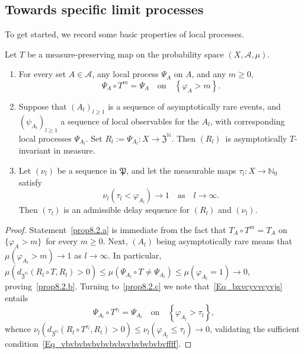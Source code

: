 \documentclass[10pt]{amsart}
\theoremstyle{definition}\newtheorem{defi}[theo]{Definition}\newtheorem{rema}[theo]{Remark}\newtheorem{exam}[theo]{Example}\newtheorem{exem}[theo]{Example}\newtheorem{nota}[theo]{Notation}
\newcommand{\clA}{\mathcal{A}}
\newcommand{\frkP}{\mathfrak{P}}
\newcommand{\frkZ}{\mathfrak{Z}}
\newcommand{\bbN}{\mathbb{N}}
\newcommand*{\alphenumi}{\renewcommand*{\theenumi}{\alph{enumi}}}
\begin{document}
\subsection{Towards specific limit processes}
To get started, we record some basic properties of local processes.

\begin{prop}\label{P_AsyInvarAdmissDelayInternal}
Let $T$ be a measure-preserving map on the probability space $(X,\clA,\mu)$.
\begin{enumerate}\alphenumi
\item\label{prop8.2.a} For every set $A\in\clA$, any local process $\Psi_{A}$ on $A$, and any $m\geq0$,
\begin{equation}\label{Eq_bxvcyvvcyvjs}
\Psi_{A}\circ T^{m}=\Psi_{A} \quad\text{on}\quad\left\{\varphi_{A}>m\right\}.
\end{equation}
\item\label{prop8.2.b} Suppose that $(A_{l})_{l\geq1}$ is a sequence of asymptotically rare events, and $(\psi_{A_{l}})_{l\geq1}$ a sequence of local observables for the $A_{l}$, with corresponding local processes $\Psi_{A_{l}}$. Set $R_{l}:=\Psi_{A_{l}}:X\rightarrow\frkZ^{\bbN}$. Then $(R_{l})$\emph{\ }is asymptotically $T$-invariant in measure.
\item\label{prop8.2.c} Let $(\nu_{l})$ be a sequence in $\frkP$, and let the measurable maps $\tau_{l}:X\rightarrow\bbN_{0}$ satisfy
\begin{equation}
\nu_{l}\left(\tau_{l}<\varphi_{A_{l}}\right) \longrightarrow1\quad\text{as}\quad l\rightarrow\infty.
\end{equation}
Then $(\tau_{l})$ is an admissible delay sequence for $(R_{l})$ and $(\nu _{l})$.
\end{enumerate}
\end{prop}

\begin{proof}
Statement~\eqref{prop8.2.a} is immediate from the fact that $T_{A}\circ T^{m}=T_{A}$ on $\{\varphi_{A}>m\}$\ for every $m\geq0$. Next, $(A_{l})$ being asymptotically rare means that $\mu(\varphi_{A_{l}}>m)\rightarrow1$ as $l\rightarrow\infty$. In particular, $\mu(d_{\frkZ^{\bbN}}(R_{l}\circ T,R_{l})>0)\leq\mu(\Psi_{A_{l}}\circ T\neq\Psi_{A_{l}})\leq\mu(\varphi_{A_{l} }=1)\rightarrow0$, proving~\eqref{prop8.2.b}. Turning to~\eqref{prop8.2.c} we note that~\eqref{Eq_bxvcyvvcyvjs} entails
\[
\Psi_{A_{l}}\circ T^{\tau_{l}}=\Psi_{A_{l}} \quad\text{on} \quad\left\{\varphi_{A_{l}}>\tau_{l}\right\},
\]
whence $\nu_{l}(d_{\frkZ^{\bbN}}(R_{l}\circ T^{\tau_{l}},R_{l})>0)\leq\nu_{l}(\varphi_{A_{l}}\leq\tau_{l})\rightarrow0$, validating the sufficient condition~\eqref{Eq_vbvbvbvbvbvbvbvvbvbvbvbvffff}.
\end{proof}
\end{document}
